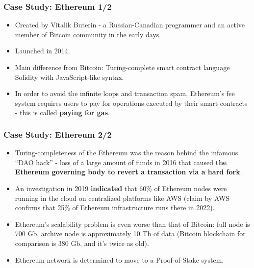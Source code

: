 \documentclass{beamer}
\begin{document}
\begin{frame}
  \frametitle{Case Study: Ethereum 1/2}
  \begin{itemize}
  \item Created by Vitalik Buterin - a Russian-Canadian programmer and an active
    member of Bitcoin community in the early days.
  \item Launched in 2014.
  \item Main difference from Bitcoin: Turing-complete smart contract language
    Solidity with JavaScript-like syntax.
  \item In order to avoid the infinite loops and transaction spam, Ethereum's
    fee system requires users to pay for operations executed by their smart
    contracts - this is called \textbf{paying for gas}.
  \end{itemize}
\end{frame}

\begin{frame}
  \frametitle{Case Study: Ethereum 2/2}
  \begin{itemize}
  \item Turing-completeness of the Ethereum was the reason behind the infamous
    ``DAO hack'' - loss of a large amount of funds in 2016 that caused
    \textbf{the Ethereum governing body to revert a transaction via a hard
      fork}.
  \item An investigation in 2019 \textbf{indicated} that 60\% of Ethereum nodes
    were running in the cloud on centralized platforms like AWS (claim by AWS
    confirms that 25\% of Ethereum infrastructure runs there in 2022).
  \item Ethereum's scalability problem is even worse than that of Bitcoin: full
    node is 700 Gb, archive node is approximately 10 Tb of data (Bitcoin
    blockchain for comparison is 380 Gb, and it's twice as old).
  \item Ethereum network is determined to move to a Proof-of-Stake system.
  \end{itemize}
\end{frame}
\end{document}
